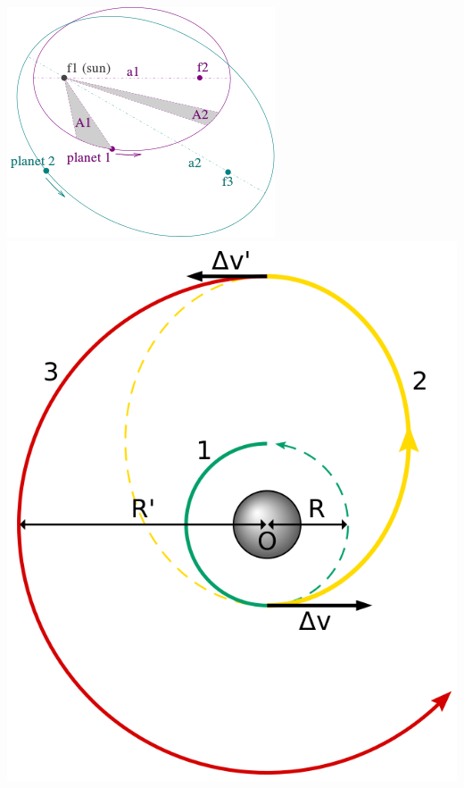 \documentclass[12pt,a4paper]{article}
\renewcommand{\=}[1]{\stackrel{#1}{=}}
\theoremstyle{definition}
\theoremstyle{remark}
\begin{document}
\begin{center}
\begin{minipage}[t]{.6\linewidth}
\begin{tabular}{ll}
\end{tabular}
\end{minipage}%
\begin{minipage}[t]{.4\linewidth}
\vspace{0pt}
\centering
\includegraphics[width=.9\linewidth]{pic/kepler.png}
\includegraphics[width=.9\linewidth]{pic/hohmann.png}
\end{minipage}
\end{center}
\end{document}
